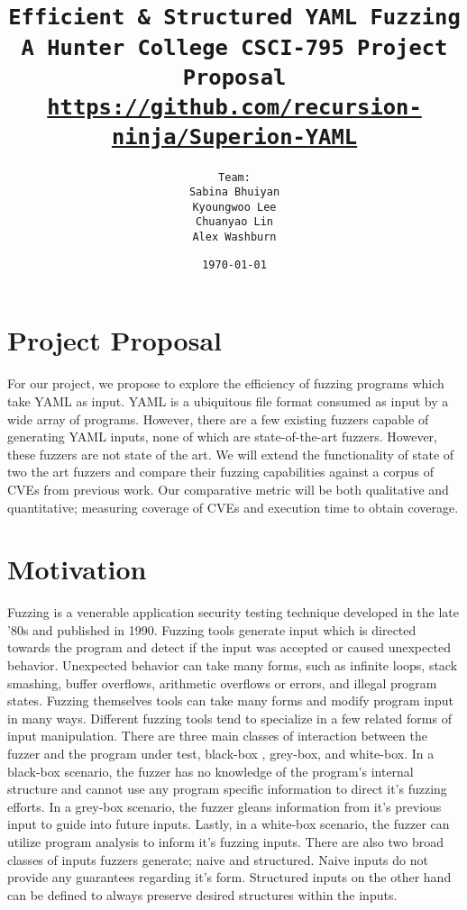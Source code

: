 \documentclass[12pt]{diazessay}
\title{\texttt{\huge{Efficient \& Structured YAML Fuzzing} \\\vspace{-0.65cm} {\large A Hunter College CSCI-795 Project Proposal}\\\normalsize\url{https://github.com/recursion-ninja/Superion-YAML}}} %
\author{\texttt{{\Huge Team:}\\\vspace*{-0.5em} 
		Sabina Bhuiyan \\\vspace*{-0.5em} 
		Kyoungwoo Lee \\\vspace*{-0.5em}
		Chuanyao Lin \\\vspace*{-0.25em}
		Alex Washburn}} %
\date{\texttt{\today}} %
\begin{document}
\maketitle %

\vspace{-2cm}
\section*{Project Proposal}

For our project, we propose to explore the efficiency of fuzzing programs which take YAML\cite{YAMLdraft} as input.
YAML is a ubiquitous file format consumed as input by a wide array of programs.
However, there are a few existing fuzzers capable of generating YAML inputs, none of which are state-of-the-art fuzzers.
However, these fuzzers are not state of the art.
We will extend the functionality of state of two the art fuzzers and compare their fuzzing capabilities against a corpus of CVEs from previous work.
Our comparative metric will be both qualitative and quantitative; measuring coverage of CVEs and execution time to obtain coverage.

\section*{Motivation}

Fuzzing is a venerable application security testing technique developed in the late '80s\cite{Barton1988} and published in 1990\cite{Miller1990}.
Fuzzing tools generate input which is directed towards the program and detect if the input was accepted or caused unexpected behavior.
Unexpected behavior can take many forms, such as infinite loops, stack smashing, buffer overflows, arithmetic overflows or errors, and illegal program states.
Fuzzing themselves tools can take many forms\cite{ModelBasedFuzzing}\cite{GrammarBasedFuzzing}\cite{ProtocolBasedFuzzing} and modify program input in many ways.
Different fuzzing tools tend to specialize in a few related forms of input\cite{InputDiversity} manipulation.
There are three main classes of interaction between the fuzzer and the program under test, black-box \cite{takanen2018fuzzing}, grey-box, and white-box.
In a black-box scenario, the fuzzer has no knowledge of the program's internal structure and cannot use any program specific information to direct it's fuzzing efforts.
In a grey-box scenario, the fuzzer gleans information from it's previous input to guide into future inputs.
Lastly, in a white-box scenario, the fuzzer can utilize program analysis to inform it's fuzzing inputs.
There are also two broad classes of inputs fuzzers generate; naive and structured.
Naive inputs do not provide any guarantees regarding it's form.
Structured inputs on the other hand can be defined to always preserve desired structures within the inputs.
\end{document}
